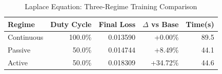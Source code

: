 \begin{table}[htbp]
\centering
\caption{Laplace Equation: Three-Regime Training Comparison}
\label{tab:laplace_regimes}
\begin{tabular}{lrrrr}
\hline
Regime & Duty Cycle & Final Loss & $\Delta$ vs Base & Time(s) \\
\hline
Continuous & 100.0\% & 0.013590 & +0.00\% & 89.5 \\
Passive & 50.0\% & 0.014744 & +8.49\% & 44.1 \\
Active & 50.0\% & 0.018309 & +34.72\% & 44.6 \\
\hline
\end{tabular}
\end{table}
